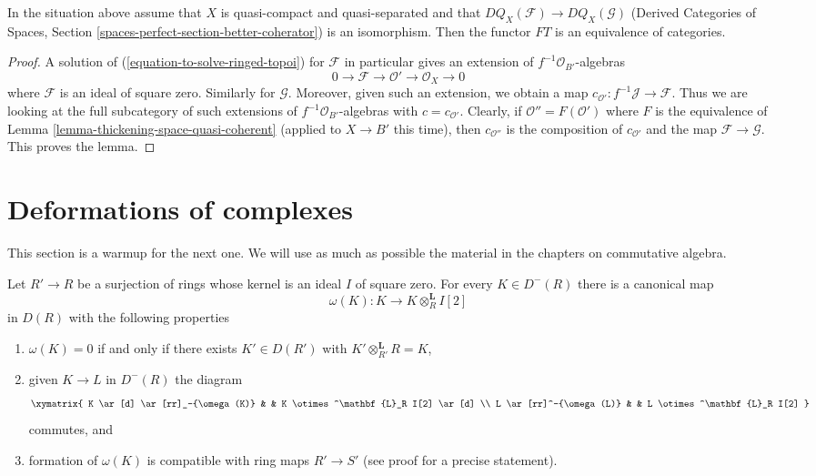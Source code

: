 \begin{lemma}
\label{lemma-thickening-over-thickening-space-quasi-coherent}
In the situation above assume that $X$ is quasi-compact and quasi-separated
and that $DQ_X(\mathcal{F}) \to DQ_X(\mathcal{G})$
(Derived Categories of Spaces, Section
\ref{spaces-perfect-section-better-coherator})
is an isomorphism. Then the functor $FT$ is an equivalence of categories.
\end{lemma}

\begin{proof}
A solution of (\ref{equation-to-solve-ringed-topoi}) for $\mathcal{F}$
in particular gives an extension of $f^{-1}\mathcal{O}_{B'}$-algebras
$$
0 \to \mathcal{F} \to \mathcal{O}' \to \mathcal{O}_X \to 0
$$
where $\mathcal{F}$ is an ideal of square zero. Similarly for $\mathcal{G}$.
Moreover, given such an extension, we obtain a map
$c_{\mathcal{O}'} : f^{-1}\mathcal{J} \to \mathcal{F}$.
Thus we are looking at the full subcategory of such extensions
of $f^{-1}\mathcal{O}_{B'}$-algebras with $c = c_{\mathcal{O}'}$.
Clearly, if $\mathcal{O}'' = F(\mathcal{O}')$ where
$F$ is the equivalence of Lemma \ref{lemma-thickening-space-quasi-coherent}
(applied to $X \to B'$ this time),
then $c_{\mathcal{O}''}$ is the composition of
$c_{\mathcal{O}'}$ and the map $\mathcal{F} \to \mathcal{G}$.
This proves the lemma.
\end{proof}





\section{Deformations of complexes}
\label{section-deformations-complexes}

\noindent
This section is a warmup for the next one.
We will use as much as possible the material
in the chapters on commutative algebra.

\begin{lemma}
\label{lemma-canonical-class-algebra}
Let $R' \to R$ be a surjection of rings whose kernel is an ideal
$I$ of square zero. For every $K \in D^-(R)$ there is a canonical
map
$$
\omega(K) : K \longrightarrow K \otimes_R^\mathbf{L} I[2]
$$
in $D(R)$ with the following properties
\begin{enumerate}
\item $\omega(K) = 0$ if and only if there exists
$K' \in D(R')$ with $K' \otimes_{R'}^\mathbf{L} R = K$,
\item given $K \to L$ in $D^-(R)$ the diagram
$$
\xymatrix{
K \ar[d] \ar[rr]_-{\omega(K)} & &
K \otimes^\mathbf{L}_R I[2] \ar[d] \\
L \ar[rr]^-{\omega(L)} & &
L \otimes^\mathbf{L}_R I[2]
}
$$
commutes, and
\item formation of $\omega(K)$ is compatible with ring maps $R' \to S'$
(see proof for a precise statement).
\end{enumerate}
\end{lemma}

